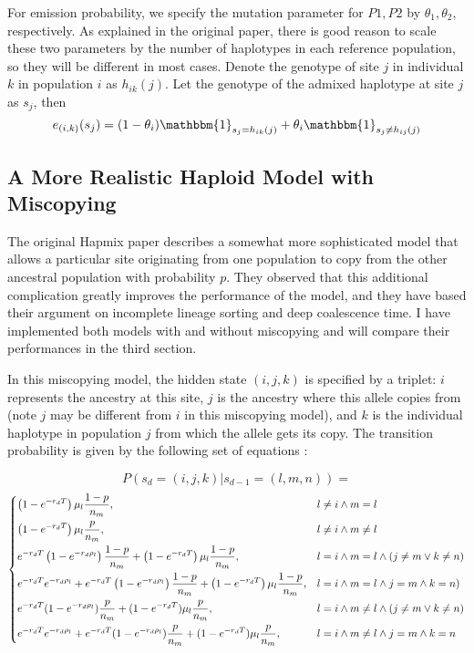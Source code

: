 \documentclass{article}
\begin{document}
For emission probability, we specify the mutation parameter for $P1,P2$ by $\theta_1,\theta_2$, respectively. As explained in the original paper, there is good reason to scale these two parameters by the number of haplotypes in each reference population, so they will be different in most cases. Denote the genotype of site $j$ in individual $k$ in population $i$ as $h_{ik}(j)$. Let the genotype of the admixed haplotype at site $j$ as $s_j$, then
\[
e_{(i,k)}(s_j)=(1-\theta_i)\mathbbm{1}_{s_j=h_{ik}(j)}+\theta_i \mathbbm{1}_{s_j \neq h_{ij}(j)}
\]


\subsection{A More Realistic Haploid Model with Miscopying}

The original Hapmix paper \cite{hapmix} describes a somewhat more sophisticated model that allows a particular site originating from one population to copy from the other ancestral population with probability $p$. They observed that this additional complication greatly improves the performance of the model, and they have based their argument on incomplete lineage sorting and deep coalescence time. I have implemented both models with and without miscopying and will compare their performances in the third section.

In this miscopying model, the hidden state $(i,j,k)$ is specified by a triplet: $i$ represents the ancestry at this site, $j$ is the ancestry where this allele copies from (note $j$ may be different from $i$ in this miscopying model), and $k$ is the individual haplotype in population $j$ from which the allele gets its copy. The transition probability is given by the following set of equations \cite{hapmix}:

\[P(s_d=(i,j,k)|s_{d-1}=(l,m,n))=\]
$$\begin{dcases}
\left(1-e^{-r_d T}\right)\mu_l\frac{1-p}{n_m}, & l\neq i \land m=l\\
\left(1-e^{-r_d T}\right)\mu_l\frac{p}{n_m}, & l\neq i \land m\neq l\\
e^{-r_d T}\left(1-e^{-r_d \rho_l}\right)\frac{1-p}{n_m}+\left(1-e^{-r_d T}\right)\mu_l \frac{1-p}{n_m}, & l=i \land m=l \land (j\neq m \lor k\neq n)\\
e^{-r_d T}e^{-r_d \rho_l}+e^{-r_d T}\left(1-e^{-r_d \rho_l}\right)\frac{1-p}{n_m}+\left(1-e^{-r_d T}\right)\mu_l \frac{1-p}{n_m}, & l=i \land m=l \land j= m \land k=n)\\
e^{-r_d T}(1-e^{-r_d \rho_l})\frac{p}{n_m}+(1-e^{-r_d T})\mu_l\frac{p}{n_m}, & l=i \land m\neq l \land (j \neq m \lor k \neq n)\\
e^{-r_d T}e^{-r_d \rho_l}+e^{-r_d T}(1-e^{-r_d \rho_l})\frac{p}{n_m}+(1-e^{-r_d T})\mu_l\frac{p}{n_m}, & l=i \land m\neq l \land j=m \land k=n\\
\end{dcases}$$
\end{document}
